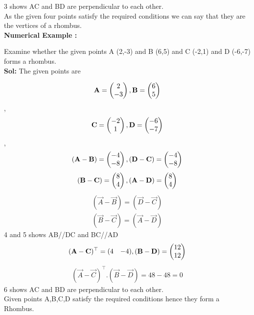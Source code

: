 \documentclass{article}
\begin{document}
{3 shows AC and BD are perpendicular to each other.}\\ 

{As the given four points satisfy the required conditions we can say that they are the vertices of a rhombus.}\\
 
\textbf{Numerical Example :}
 
{Examine whether the given points A (2,-3) and B (6,5) and C (-2,1) and D (-6,-7) forms a rhombus.}\\

 \textbf{Sol:}
 The given points are

$$\mathbf{A} = \begin{pmatrix}2\\-3\end{pmatrix}, \mathbf{B} =\begin{pmatrix}6\\5\end{pmatrix}$$,
$$\mathbf{C} =\begin{pmatrix}-2\\1\end{pmatrix}, \mathbf{D} =\begin{pmatrix}-6\\-7\end{pmatrix}$$,
$$(\mathbf{A}-\mathbf{B} ) = \begin{pmatrix}-4\\-8\end{pmatrix}, (\mathbf{D}-\mathbf{C} ) = \begin{pmatrix}-4\\-8\end{pmatrix}$$
$$(\mathbf{B}-\mathbf{C} ) = \begin{pmatrix}8\\4\end{pmatrix}, (\mathbf{A}-\mathbf{D} ) = \begin{pmatrix}8\\4\end{pmatrix}$$
\begin{align}
(\vec{A}-\vec{B} ) = (\vec{D}-\vec{C} )\\
(\vec{B}-\vec{C} )  = (\vec{A}-\vec{D} )
 \end{align}
{4 and 5 shows AB//DC and BC//AD}
$$(\mathbf{A}-\mathbf{C} )^\top = \begin{matrix}
(4 & -4 )
\end{matrix},(\mathbf{B}-\mathbf{D} ) = \begin{pmatrix}12\\12\end{pmatrix}$$
 \begin{align}
(\vec{A}-\vec{C} )^ \top. ( \vec{B}-\vec{D} ) = 48-48 = 0
 \end{align}
{6 shows AC and BD are perpendicular to each other.}\\
{Given points A,B,C,D satisfy the required 
conditions hence they form a Rhombus.}

\end{document}
